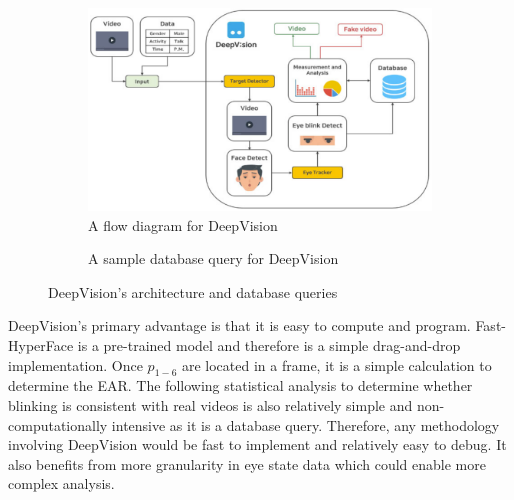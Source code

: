 \begin{figure}[h]
    \centering
    \begin{subfigure}{0.45\textwidth}
        \centering
        \includegraphics[width=\linewidth]{dissertation//figures/deepvision-flow.png}
        \caption{A flow diagram for DeepVision\cite{jung2020deepvision}}
        \label{fig:deepvision-flow}
    \end{subfigure}
    \hfill
    \begin{subfigure}{0.45\textwidth}
        \centering
        \caption{A sample database query for DeepVision\cite{jung2020deepvision}}
        \label{fig:deepvision-database}
    \end{subfigure}
    \caption{DeepVision's architecture and database queries}
    \label{fig:deepvision}
\end{figure}

DeepVision's primary advantage is that it is easy to compute and program. Fast-HyperFace is a pre-trained model and therefore is a simple drag-and-drop implementation. Once $p_{1-6}$ are located in a frame, it is a simple calculation to determine the EAR. The following statistical analysis to determine whether blinking is consistent with real videos is also relatively simple and non-computationally intensive as it is a database query. Therefore, any methodology involving DeepVision would be fast to implement and relatively easy to debug. It also benefits from more granularity in eye state data which could enable more complex analysis.

